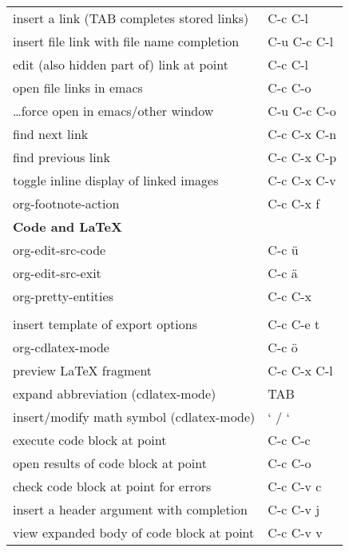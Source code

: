 \documentclass[english]{rcalibrionecolumn}
\begin{document}
\begin{longtable}{ll}
 insert a link (TAB completes stored links)    &  C-c C-l               \\
 insert file link with file name completion    &  C-u C-c C-l           \\
 edit (also hidden part of) link at point      &  C-c C-l               \\
 open file links in emacs                      &  C-c C-o               \\
 \ldots{}force open in emacs/other window      &  C-u C-c C-o           \\
 find next link                                &  C-c C-x C-n           \\
 find previous link                            &  C-c C-x C-p           \\
 toggle inline display of linked images        &  C-c C-x C-v           \\
 org-footnote-action                           &  C-c C-x f             \\
\hline
 \textbf{Code and \LaTeX{}}                    &                        \\
 org-edit-src-code                             &  C-c ü                 \\
 org-edit-src-exit                             &  C-c ä                 \\
 org-pretty-entities                           &  C-c C-x \\            \\
 insert template of export options             &  C-c C-e t             \\
 org-cdlatex-mode                              &  C-c ö                 \\
 preview \LaTeX{} fragment                     &  C-c C-x C-l           \\
 expand abbreviation (cdlatex-mode)            &  TAB                   \\
 insert/modify math symbol (cdlatex-mode)      &  ` / `                 \\
 execute code block at point                   &  C-c C-c               \\
 open results of code block at point           &  C-c C-o               \\
 check code block at point for errors          &  C-c C-v c             \\
 insert a header argument with completion      &  C-c C-v j             \\
 view expanded body of code block at point     &  C-c C-v v             \\

\end{longtable}
\end{document}
